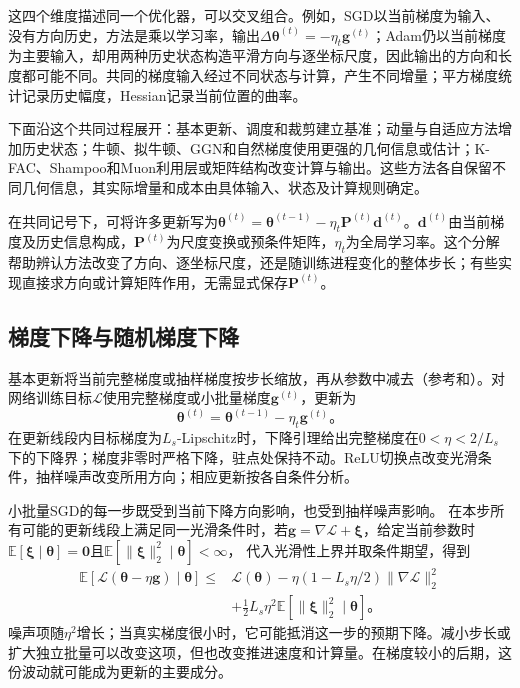 这四个维度描述同一个优化器，可以交叉组合。例如，SGD以当前梯度为输入、没有方向历史，方法是乘以学习率，输出$\Delta\bm\theta^{(t)}=-\eta_t\bm g^{(t)}$；Adam仍以当前梯度为主要输入，却用两种历史状态构造平滑方向与逐坐标尺度，因此输出的方向和长度都可能不同。共同的梯度输入经过不同状态与计算，产生不同增量；平方梯度统计记录历史幅度，Hessian记录当前位置的曲率。

下面沿这个共同过程展开：基本更新、调度和裁剪建立基准；动量与自适应方法增加历史状态；牛顿、拟牛顿、GGN和自然梯度使用更强的几何信息或估计；K-FAC、Shampoo和Muon利用层或矩阵结构改变计算与输出。这些方法各自保留不同几何信息，其实际增量和成本由具体输入、状态及计算规则确定。

在共同记号下，可将许多更新写为$\bm\theta^{(t)}=\bm\theta^{(t-1)}-\eta_t\bm P^{(t)}\bm d^{(t)}$。$\bm d^{(t)}$由当前梯度及历史信息构成，$\bm P^{(t)}$为尺度变换或预条件矩阵，$\eta_t$为全局学习率。这个分解帮助辨认方法改变了方向、逐坐标尺度，还是随训练进程变化的整体步长；有些实现直接求方向或计算矩阵作用，无需显式保存$\bm P^{(t)}$。

\subsection{梯度下降与随机梯度下降}
\label{sec:training-gradient-schedules}

基本更新将当前完整梯度或抽样梯度按步长缩放，再从参数中减去（参考和）。对网络训练目标$\mathcal L$使用完整梯度或小批量梯度$\bm g^{(t)}$，更新为
\begin{equation}
  \bm\theta^{(t)}=\bm\theta^{(t-1)}-\eta_t\bm g^{(t)}\text{。}
  \label{eq:training-sgd}
\end{equation}
在更新线段内目标梯度为$L_s$-Lipschitz时，下降引理给出完整梯度在$0<\eta<2/L_s$下的下降界；梯度非零时严格下降，驻点处保持不动。ReLU切换点改变光滑条件，抽样噪声改变所用方向；相应更新按各自条件分析。

小批量SGD的每一步既受到当前下降方向影响，也受到抽样噪声影响。
在本步所有可能的更新线段上满足同一光滑条件时，若$\bm g=\nabla\mathcal L+\bm\xi$，给定当前参数时
$\mathbb E[\bm\xi\mid\bm\theta]=\bm0$且$\mathbb E[\lVert\bm\xi\rVert_2^2\mid\bm\theta]<\infty$，
代入光滑性上界并取条件期望，得到
\begin{equation}
  \begin{aligned}
  \mathbb E[\mathcal L(\bm\theta-\eta\bm g)\mid\bm\theta]
  \leq{}&\mathcal L(\bm\theta)
    -\eta(1-L_s\eta/2)\lVert\nabla\mathcal L\rVert_2^2\\
    &+\tfrac12L_s\eta^2\mathbb E[\lVert\bm\xi\rVert_2^2\mid\bm\theta]\text{。}
  \end{aligned}
  \label{eq:training-stochastic-descent}
\end{equation}
噪声项随$\eta^2$增长；当真实梯度很小时，它可能抵消这一步的预期下降。减小步长或扩大独立批量可以改变这项，但也改变推进速度和计算量。在梯度较小的后期，这份波动就可能成为更新的主要成分。

